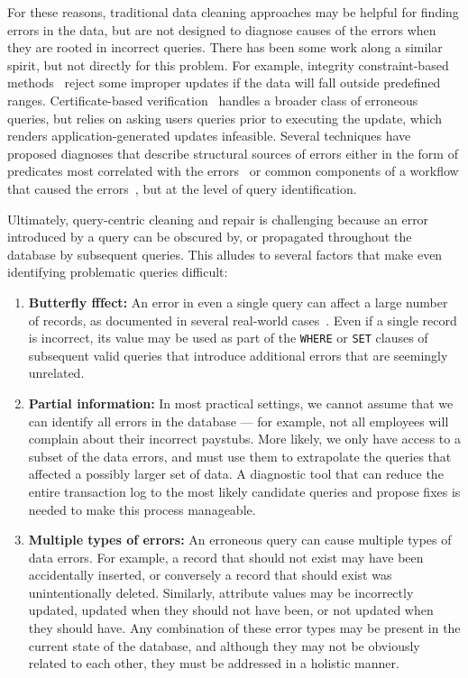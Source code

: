 For these reasons, traditional data cleaning approaches may be helpful for finding errors in the data, but are
not designed to diagnose causes of the errors when they are rooted in incorrect queries.
There has been some work along a similar spirit, but not directly for this problem.  
For example, integrity constraint-based methods~\cite{Khoussainova2006} reject some improper
updates if the data will fall outside predefined ranges.
Certificate-based verification~\cite{Chen2011} handles a broader class of erroneous queries,
but relies on asking users queries prior to executing the update, which renders application-generated
updates infeasible.
Several techniques have proposed diagnoses that describe structural sources of errors
either in the form of predicates most correlated with the errors~\cite{Wu13}
or common components of a workflow that caused the errors~\cite{wang2015}, but at the level
of query identification.

Ultimately, query-centric cleaning and repair is challenging because an error introduced by a query can be obscured by, or propagated throughout the database
by subsequent queries. This alludes to several factors that make even identifying problematic queries difficult:

\begin{enumerate}[leftmargin=*, topsep=0mm, itemsep=0mm]

  \item \textbf{Butterfly fffect: } 
  An error in even a single query can affect a large number of records, as documented in several real-world
  cases~\cite{Yates10, Grady13, sakalerrors}.  Even if a single record is incorrect,
  its value may be used as part of the \texttt{WHERE} or \texttt{SET} clauses of 
  subsequent valid queries that introduce additional errors that are seemingly unrelated.

  \item \textbf{Partial information:}  In most practical settings, we cannot assume that we can identify all
  errors in the database --- for example, not all employees will complain about their incorrect paystubs.  
  More likely, we only have access to a subset of the data errors, and must use them to extrapolate 
  the queries that affected a possibly larger set of data.  A diagnostic tool that can reduce
  the entire transaction log to the most likely candidate queries and propose fixes
  is needed to make this process manageable.


  \item \textbf{Multiple types of errors:} 
  An erroneous query can cause multiple types of data errors.  For example, a record that should not exist may have been accidentally inserted, or conversely a record that 
  should exist was unintentionally deleted.  Similarly, attribute values may be incorrectly updated,
  updated when they should not have been, or not updated when they should have.  
  Any combination of these error types may be present in the current state of the database,
  and although they may not be obviously related to each other, they must be addressed in a holistic manner.  

\end{enumerate}


